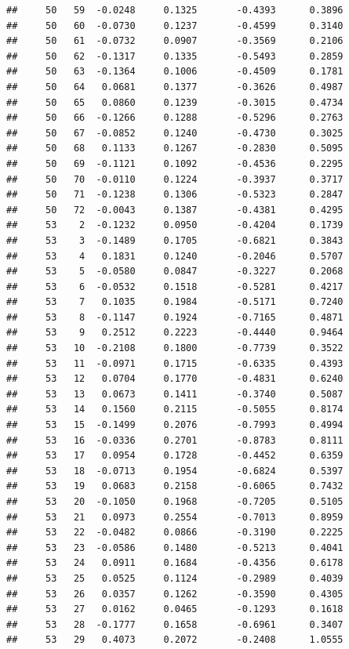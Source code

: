 \documentclass[
]{article}
\begin{document}
\begin{verbatim}
##     50   59  -0.0248     0.1325       -0.4393      0.3896 
##     50   60  -0.0730     0.1237       -0.4599      0.3140 
##     50   61  -0.0732     0.0907       -0.3569      0.2106 
##     50   62  -0.1317     0.1335       -0.5493      0.2859 
##     50   63  -0.1364     0.1006       -0.4509      0.1781 
##     50   64   0.0681     0.1377       -0.3626      0.4987 
##     50   65   0.0860     0.1239       -0.3015      0.4734 
##     50   66  -0.1266     0.1288       -0.5296      0.2763 
##     50   67  -0.0852     0.1240       -0.4730      0.3025 
##     50   68   0.1133     0.1267       -0.2830      0.5095 
##     50   69  -0.1121     0.1092       -0.4536      0.2295 
##     50   70  -0.0110     0.1224       -0.3937      0.3717 
##     50   71  -0.1238     0.1306       -0.5323      0.2847 
##     50   72  -0.0043     0.1387       -0.4381      0.4295 
##     53    2  -0.1232     0.0950       -0.4204      0.1739 
##     53    3  -0.1489     0.1705       -0.6821      0.3843 
##     53    4   0.1831     0.1240       -0.2046      0.5707 
##     53    5  -0.0580     0.0847       -0.3227      0.2068 
##     53    6  -0.0532     0.1518       -0.5281      0.4217 
##     53    7   0.1035     0.1984       -0.5171      0.7240 
##     53    8  -0.1147     0.1924       -0.7165      0.4871 
##     53    9   0.2512     0.2223       -0.4440      0.9464 
##     53   10  -0.2108     0.1800       -0.7739      0.3522 
##     53   11  -0.0971     0.1715       -0.6335      0.4393 
##     53   12   0.0704     0.1770       -0.4831      0.6240 
##     53   13   0.0673     0.1411       -0.3740      0.5087 
##     53   14   0.1560     0.2115       -0.5055      0.8174 
##     53   15  -0.1499     0.2076       -0.7993      0.4994 
##     53   16  -0.0336     0.2701       -0.8783      0.8111 
##     53   17   0.0954     0.1728       -0.4452      0.6359 
##     53   18  -0.0713     0.1954       -0.6824      0.5397 
##     53   19   0.0683     0.2158       -0.6065      0.7432 
##     53   20  -0.1050     0.1968       -0.7205      0.5105 
##     53   21   0.0973     0.2554       -0.7013      0.8959 
##     53   22  -0.0482     0.0866       -0.3190      0.2225 
##     53   23  -0.0586     0.1480       -0.5213      0.4041 
##     53   24   0.0911     0.1684       -0.4356      0.6178 
##     53   25   0.0525     0.1124       -0.2989      0.4039 
##     53   26   0.0357     0.1262       -0.3590      0.4305 
##     53   27   0.0162     0.0465       -0.1293      0.1618 
##     53   28  -0.1777     0.1658       -0.6961      0.3407 
##     53   29   0.4073     0.2072       -0.2408      1.0555 

\end{verbatim}
\end{document}
